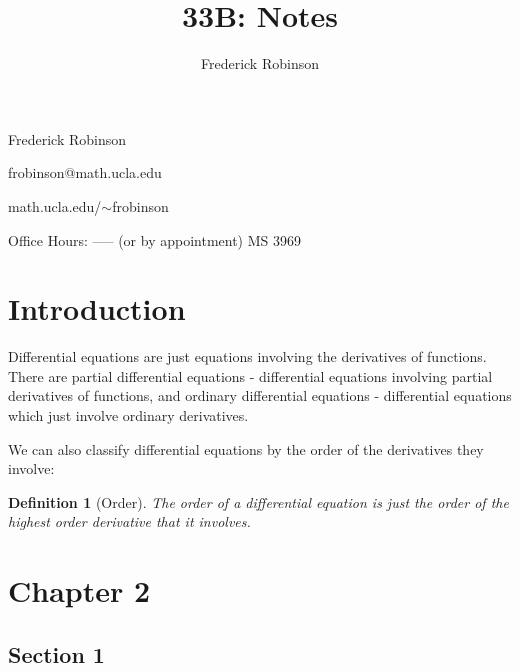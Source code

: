 \documentclass[14pt]{article}
\title{33B: Notes}
\author{Frederick Robinson}
\newtheorem{defn}{Definition}
\begin{document}
\maketitle

\pagebreak

Frederick Robinson

frobinson@math.ucla.edu

math.ucla.edu/$\sim$frobinson

Office Hours: ----- (or by appointment)
MS 3969

\pagebreak

\section{Introduction}

Differential equations are just equations involving the derivatives of functions. There are partial
differential equations - differential equations involving partial derivatives of functions, and
ordinary differential equations - differential equations which just involve ordinary derivatives. 

We can also classify differential equations by the order of the derivatives they involve:
\begin{defn}[Order]The \emph{order} of a differential equation is just the order of the highest
  order derivative that it involves.\end{defn}


\section{Chapter 2}

\subsection{Section 1}
\end{document}
